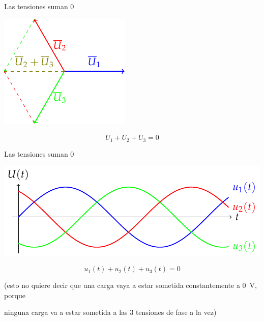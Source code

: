 \documentclass[aspectratio=169, usenames,svgnames,dvipsnames]{beamer}
\begin{document}

\begin{frame}{Las tensiones suman 0} \label{diapo:sumaFasores_Cero}
    \begin{center}
        \includegraphics[height=0.6\textheight]{../figs/FasoresSumaCero.pdf}
    \end{center}
    
    \[
        \boxed{\overline{U}_1 + \overline{U}_2 + \overline{U}_3 = 0}
    \]
\end{frame}


\begin{frame}{Las tensiones suman 0}
    \vspace{2mm}
    \begin{center}
        \includegraphics[width=.8\linewidth]{../figs/TensionesTrifasica.pdf}
    \end{center}
    
    \[
        \boxed{u_1(t) + u_2(t) + u_3(t) = 0}
    \]

    \vspace{4mm}
    \begin{center}
        \small{(esto no quiere decir que una carga vaya a estar sometida constantemente a \qty{0}{\volt}, porque 

        \vspace{-1mm}
        \alert{ninguna carga} va a estar \alert{sometida a las 3 tensiones} de fase a la vez)}
    \end{center}
    
\end{frame}
\end{document}
